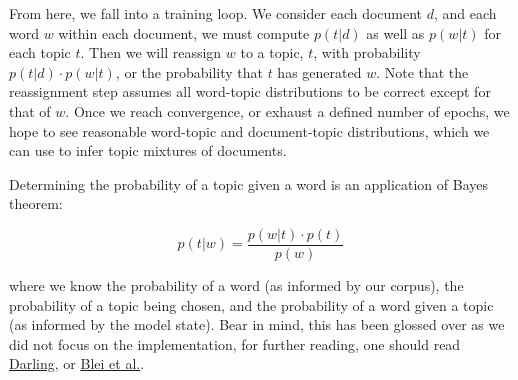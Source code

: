 \documentclass[11pt, twoside, reqno]{book}
\begin{document}
From here, we fall into a training loop. We consider each document $d$, and each word $w$ within each document, we must compute $p(t | d)$ as well as $p(w | t)$ for each topic $t$. Then we will reassign $w$ to a topic, $t$, with probability $p(t | d) \cdot p(w | t)$, or the probability that $t$ has generated $w$. Note that the reassignment step assumes all word-topic distributions to be correct except for that of $w$. Once we reach convergence, or exhaust a defined number of epochs, we hope to see reasonable word-topic and document-topic distributions, which we can use to infer topic mixtures of documents.

Determining the probability of a topic given a word is an application of Bayes theorem:

$$p(t | w) = \frac{p(w | t)\cdot p(t)}{p(w)}$$

where we know the probability of a word (as informed by our corpus), the probability of a topic being chosen, and the probability of a word given a topic (as informed by the model state). Bear in mind, this has been glossed over as we did not focus on the implementation, for further reading, one should read \href{http://www.ccs.neu.edu/home/vip/teach/DMcourse/5_topicmodel_summ/notes_slides/sampling/darling-lda.pdf}{Darling}, or \href{http://jmlr.csail.mit.edu/papers/v3/blei03a.html}{Blei et al.}.
\end{document}
